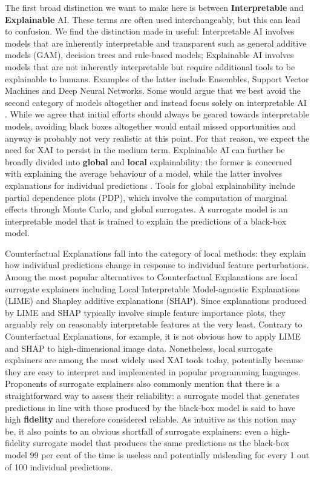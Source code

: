 \documentclass{juliacon}
\begin{document}
The first broad distinction we want to make here is between
\textbf{Interpretable} and \textbf{Explainable} AI. These terms are
often used interchangeably, but this can lead to confusion. We find the
distinction made in \textcite{rudin2019stop} useful: Interpretable AI
involves models that are inherently interpretable and transparent such
as general additive models (GAM), decision trees and rule-based models;
Explainable AI involves models that are not inherently interpretable but
require additional tools to be explainable to humans. Examples of the
latter include Ensembles, Support Vector Machines and Deep Neural
Networks. Some would argue that we best avoid the second category of
models altogether and instead focus solely on interpretable AI
\textcite{rudin2019stop}. While we agree that initial efforts should
always be geared towards interpretable models, avoiding black boxes
altogether would entail missed opportunities and anyway is probably not
very realistic at this point. For that reason, we expect the need for
XAI to persist in the medium term. Explainable AI can further be broadly
divided into \textbf{global} and \textbf{local} explainability: the
former is concerned with explaining the average behaviour of a model,
while the latter involves explanations for individual predictions
\autocite{molnar2020interpretable}. Tools for global explainability
include partial dependence plots (PDP), which involve the computation of
marginal effects through Monte Carlo, and global surrogates. A surrogate
model is an interpretable model that is trained to explain the
predictions of a black-box model.

Counterfactual Explanations fall into the category of local methods:
they explain how individual predictions change in response to individual
feature perturbations. Among the most popular alternatives to
Counterfactual Explanations are local surrogate explainers including
Local Interpretable Model-agnostic Explanations (LIME) and Shapley
additive explanations (SHAP). Since explanations produced by LIME and
SHAP typically involve simple feature importance plots, they arguably
rely on reasonably interpretable features at the very least. Contrary to
Counterfactual Explanations, for example, it is not obvious how to apply
LIME and SHAP to high-dimensional image data. Nonetheless, local
surrogate explainers are among the most widely used XAI tools today,
potentially because they are easy to interpret and implemented in
popular programming languages. Proponents of surrogate explainers also
commonly mention that there is a straightforward way to assess their
reliability: a surrogate model that generates predictions in line with
those produced by the black-box model is said to have high
\textbf{fidelity} and therefore considered reliable. As intuitive as
this notion may be, it also points to an obvious shortfall of surrogate
explainers: even a high-fidelity surrogate model that produces the same
predictions as the black-box model 99 per cent of the time is useless
and potentially misleading for every 1 out of 100 individual
predictions.
\end{document}
